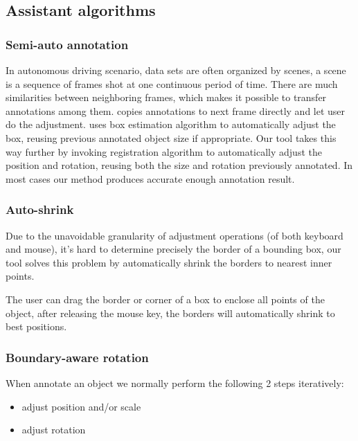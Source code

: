 \documentclass[letterpaper, 10 pt, conference]{ieeeconf}  %
\begin{document}
\subsection{Assistant algorithms}

\subsubsection{Semi-auto annotation}
\label{semi-auto-anno}
In autonomous driving scenario, data sets are often organized by scenes\cite{Caesar2019nuScenesAM,Patil2019TheHD,lyft2019}, a scene is a sequence of frames shot at one continuous period of time. There are much similarities between neighboring frames, which makes it possible to transfer annotations among them. \cite{Zimmer20193DBA} copies annotations to next frame directly and let user do the adjustment.\cite{Wang2019LATTEAL} uses box estimation algorithm to automatically adjust the box, reusing previous annotated object size if appropriate. Our tool takes this way further by invoking registration algorithm \cite{Yang2016GoICPAG} to automatically adjust the position and rotation, reusing both the size and rotation previously annotated. In most cases our method produces  accurate enough annotation result.


\subsubsection{Auto-shrink}

Due to the unavoidable granularity of adjustment operations (of both keyboard and mouse), it's hard to determine precisely the border of a bounding box, our tool solves this problem by automatically shrink the borders to nearest inner points.

The user can drag the border or corner of a box to enclose all points of the object, after releasing the mouse key, the borders will automatically shrink to best positions.

\subsubsection{Boundary-aware rotation}

When annotate an object we normally perform the following 2 steps iteratively:
\begin{itemize}
	\item adjust position and/or scale
	\item adjust rotation	
\end{itemize}
\end{document}
